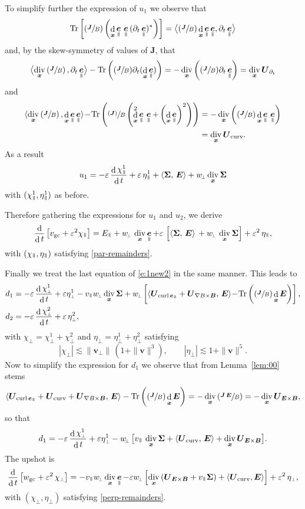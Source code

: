 \documentclass[10pt]{amsart}
\newcommand{\sperp}{{\scriptscriptstyle\perp}}
\newcommand{\blangle}{\bigl\langle}
\newcommand{\brangle}{\bigr\rangle}
\newcommand{\Psfrac}[2]{(\sfrac{#1}{#2})}
\newcommand{\psfrac}[2]{\sfrac{(#1)}{#2}}
\let\eps\varepsilon
\let\d\partial
\DeclareMathOperator\dD{d}\let\dd\dD
\DeclareMathOperator{\Tr}{Tr}
\DeclareMathOperator{\Div}{div}
\DeclareMathOperator{\Curl}{curl}
\theoremstyle{plain}
\theoremstyle{definition}
\newcommand{\be}{\begin{equation}}
\newcommand{\ee}{\end{equation}}
\newcommand\bB{{\boldsymbol B}}
\newcommand\bE{{\boldsymbol E}}
\newcommand\bJ{{\boldsymbol J}}
\newcommand\bU{{\boldsymbol U}}
\newcommand\bfv{{\boldsymbol v}}
\newcommand\bfx{{\boldsymbol x}}
\newcommand\Sig{{\boldsymbol \Sigma}}
\DeclareMathOperator{\beD}{\boldsymbol{e}}
\newcommand\eDpar{\beD_\mypar}
\newcommand\vpar{v_\mypar}
\newcommand\bvperp{\bfv_{\!\sperp}}
\newcommand\eperp{w_{\!\sperp}}
\newcommand\Epar{E_\mypar}
\newcommand{\eGC}{w_\mathrm{gc}}
\newcommand{\vGC}{v_\mathrm{gc}}
\newcommand{\EcB}{\bU_{\bE\times\bB}}
\newcommand{\gradB}{\bU_{\nabla B\times\bB}}
\newcommand{\curvB}{\bU_{\mathrm{curv}}}
\newcommand{\rotB}{\bU_{\Curl\eDpar}}
\newcommand{\dtB}{\bU_{\d_t}}
\newcommand{\mypar}{{\mkern3mu\vphantom{\perp}\vrule depth 0pt\mkern2mu\vrule depth 0pt\mkern3mu}}
\begin{document}
To simplify further the expression of $u_1$ we observe that
\[
\Tr\left[\Psfrac{\bJ}{B}\left(\dD_\bfx\eDpar\,\eDpar\,(\d_t\eDpar)^*\right)\right]
= \blangle\Psfrac{\bJ}{B}\dD_\bfx\eDpar\eDpar,\d_t\eDpar\brangle
\]
and, by the skew-symmetry of values of $\bJ$, that
\[
\blangle\Div_\bfx\left(\sfrac{\bJ}{B}\right),
\d_t\eDpar\brangle
-\Tr\left(\Psfrac{\bJ}{B}\d_t(\dD_\bfx\eDpar)\right) =-\Div_\bfx\left(\Psfrac{\bJ}{B}\d_t\eDpar\right)=\Div_\bfx\dtB
\]
and
\begin{align*}
\langle\Div_\bfx\left(\sfrac{\bJ}{B}\right),
\dD_\bfx\eDpar\eDpar\rangle
\!-\!\Tr\left(\psfrac{\bJ}{B}\left(\dD_{\bfx}^2\eDpar\,\eDpar+\left(\dD_{\bfx}\eDpar\right)^2\right)\right)
&=-\Div_\bfx\left(\Psfrac{\bJ}{B}\dD_\bfx\eDpar\,\eDpar\right)\\
& =\Div_\bfx\curvB.
\end{align*}
As a result
\[
u_1 = -\eps\,\frac{\dD\chi_\mypar^1}{\dD t}+\eps\,\eta_\mypar^1 +
\langle\Sig,\,\bE\rangle +\eperp\Div_\bfx\Sig
\]
with $(\chi_\mypar^1,\eta_\mypar^1)$ as before.

Therefore gathering the expressions for $u_1$ and $u_2$, we derive
\[
\frac{\dD }{\dD t}\left[\vGC+\eps^2\chi_\mypar\right]
= \Epar+\eperp\,\Div_\bfx\eDpar +\eps \,\left[\langle\Sig,\,\bE\rangle
\, + \eperp\,\Div_\bfx\Sig\right] + \eps^2\,\eta_\mypar,
\]
with $(\chi_\mypar,\eta_\mypar)$ satisfying \eqref{par-remainders}.

Finally we treat the last equation of \eqref{e:1new2} in the same manner. This leads to
\begin{align*}
d_1 &= -\eps\,\frac{\dD\chi_\sperp^1}{\dD t}+\eps\eta_\sperp^1 -
\vpar\eperp\Div_\bfx\Sig+\eperp\left[\langle \rotB + \gradB,\, \bE
\rangle \!-\!
\Tr\left(\Psfrac{\bJ}{B}\dD_{\bfx}\bE\right)\right],\\
d_2&=-\eps\,\frac{\dD\chi_\sperp^2}{\dD t}+\eps\,\eta_\sperp^2,
\end{align*}
with $\chi_\sperp=\chi^1_\sperp+\chi^2_\sperp$ and $\eta_\sperp=\eta_\sperp^1+\eta_\sperp^2$ satisfying
\be\label{perp-remainders}
|\chi_\sperp|\lesssim \|\bvperp\|\,(1+\|\bfv\|^3),\qquad
|\eta_\sperp|\lesssim 1+\|\bfv\|^5.
\ee
Now to simplify the expression for $d_1$ we observe that from Lemma~\ref{lem:00} stems
\[
\langle \rotB+\curvB + \gradB,\, \bE\rangle
-\Tr\left(\Psfrac{\bJ}{B}\dD_{\bfx}\bE\right) =
-\Div_\bfx\left( \sfrac{\bJ \,\bE}{B}\right) = -\Div_\bfx \EcB,
\]
so that
\[
d_1 = -\eps\,\frac{\dD\chi_\sperp^1}{\dD t}+\eps\eta_\sperp^1 -\eperp\,\bigl[\vpar\,\Div_\bfx\Sig+\langle \curvB,\, \bE\rangle +
\Div_\bfx\EcB \bigr].
\]
The upshot is
\[
\frac{\dD }{\dD t}\left[\eGC+\eps^2\,\chi_\sperp\right]
= -\vpar \eperp\Div_\bfx\eDpar
-\eps\eperp\left[\Div_\bfx \left(\EcB+ \vpar\Sig\right)+\langle \curvB,\bE\rangle \right] +\eps^2\,\eta_\sperp,
\]
with $(\chi_\sperp,\eta_\sperp)$ satisfying \eqref{perp-remainders}.
\end{document}
